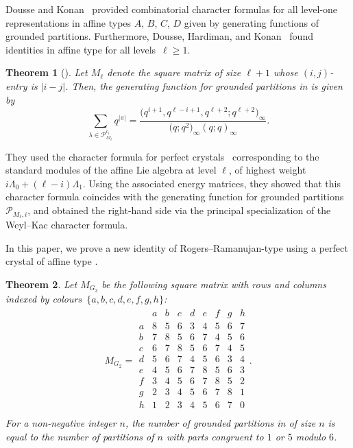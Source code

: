 \documentclass[10pt,a4paper]{amsart}
\numberwithin{equation}{section}
\newtheorem{Theorem}{Theorem}[section]
\theoremstyle{definition}
\begin{document}
Dousse and Konan~\cite{DK19b,DK22, DK22c} provided combinatorial character formulas for all level-one representations in affine types $A$, $B$, $C$, $D$ given by generating functions of grounded partitions. Furthermore, Dousse, Hardiman, and Konan~\cite{DHK25} found identities in affine type  for all levels~${\ell \geq 1}$.

\begin{Theorem}[{\cite[Theorem~1.6]{DHK25}}]%
Let $M_\ell$ denote the square matrix of size $\ell+1$ whose
$(i,j)$-entry is $|i-j|$. Then, the generating function for grounded partitions in
 is given by
\[
 \sum_{\lambda \in \mathcal{P}_{M_\ell}^{c_i}} q^{|\pi|} = \frac{\bigl(q^{i+1}, q^{\ell-i+1}, q^{\ell+2}; q^{\ell+2}\bigr)_\infty}{\bigl(q;q^2\bigr)_\infty (q;q)_\infty}.
\]
\end{Theorem}
They used the character formula for perfect crystals~\cite{KMN92} corresponding to
the standard modules of the affine Lie algebra  at
level $ \ell $, of highest weight
$ i \Lambda_0 + (\ell-i) \Lambda_1 $. Using the associated energy
matrices, they showed that this character formula coincides with the
generating function for grounded partitions $ \mathcal{P}_{M_\ell, i} $,
and obtained the right-hand side via the principal specialization of
the Weyl--Kac character formula.

In this paper, we prove a new identity of Rogers--Ramanujan-type using a perfect crystal of affine type .


\begin{Theorem}\label{thm:G2identity}
Let $M_{G_2}$ be the following square matrix with rows and columns indexed by colours~$\{a,b,c,d,e,f,g,h\}$:
\begin{align*}
M_{G_2} = \begin{array}{c|cccccccc}
& a & b & c & d & e & f & g & h \\
\hline
a &8&5&6&3&4&5&6&7\\
b &7&8&5&6&7&4&5&6\\
c &6&7&8&5&6&7&4&5\\
d &5&6&7&4&5&6&3&4\\
e &4&5&6&7&8&5&6&3\\
f &3&4&5&6&7&8&5&2\\
g &2&3&4&5&6&7&8&1\\
h &1&2&3&4&5&6&7&0\\
\end{array}.
\end{align*}
For a non-negative integer $n$, the number of grounded partitions in  of size $n$ is equal to the number of partitions of $n$ with parts congruent to $1$ or $5$ modulo $6$.
\end{Theorem}
\end{document}

